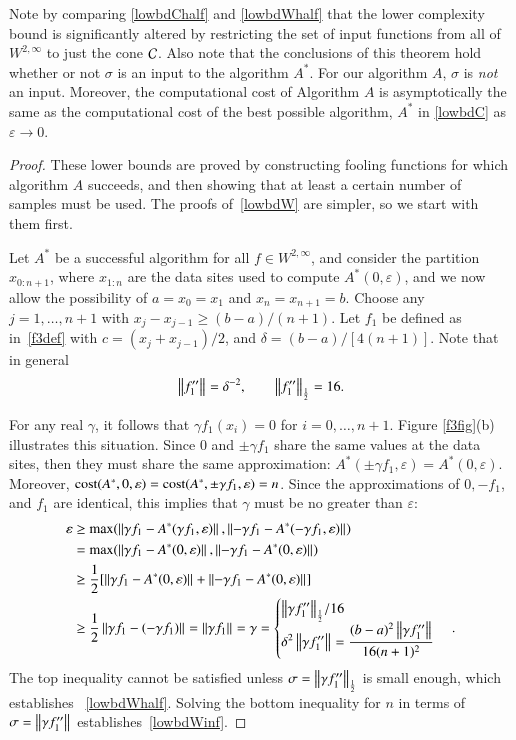\documentclass[review]{elsarticle}
\newcommand{\abstol}{\varepsilon}
\theoremstyle{definition}
\renewcommand{\cw}{W}
\begin{document}
Note by comparing \eqref{lowbdChalf} and \eqref{lowbdWhalf} that the lower complexity
bound is significantly altered by restricting the
set of input functions from all of $ \cw^{2,\infty}$ to just the cone
$\cc$. Also note that the
conclusions of this theorem hold whether or not $\sigma$ is an input to the
algorithm $A^*$. For our algorithm $A$, $\sigma$ is \emph{not} an input. Moreover, the
computational cost of Algorithm $A$ is asymptotically
the same as the computational cost of the best possible algorithm, $A^*$ in
\eqref{lowbdC} as $\abstol \to 0$.

\begin{proof}
	These lower bounds are proved by constructing fooling functions for which
	algorithm $A$ succeeds, and then showing that at least a certain number of
	samples must be used. The proofs of~\eqref{lowbdW} are simpler, so
	we start with them first.
		
	Let $A^*$ be a successful algorithm for all $f \in \cw^{2,\infty}$, and consider
	the partition $x_{0:n+1}$, where $x_{1:n}$ are the data sites
	used to compute $A^*(0,\abstol)$, and we now allow the possibility of $a = x_0=x_1$
	and $x_n = x_{n+1} = b$. Choose any $j=1, \ldots, n+1$ with
	$x_j-x_{j-1} \ge (b-a)/(n+1)$. Let $f_1$ be defined as in~\eqref{f3def} with $c
	= (x_j+x_{j-1})/2$, and $\delta = (b-a)/[4(n+1)]$. Note that in general
	\begin{equation}
	\norm{f_1''} =  \delta^{-2}, \qquad \norm[\frac 12]{f_1''} = 16.
	\end{equation}

	For any real $\gamma$, it follows that $\gamma f_1(x_i)=0$ for $i=0, \ldots,
	n+1$. Figure \ref{f3fig}(b) illustrates this situation. Since $0$ and $\pm
	\gamma f_1$ share the same values at the data sites, then they must share the
	same approximation: $A^*(\pm \gamma f_1,\abstol) = A^*(0,\abstol)$. Moreover,
	$\cost(A^*,0,\abstol) = \cost(A^*,\pm \gamma f_1,\abstol) = n$. Since the
	approximations of $0, -f_1$, and $f_1$ are identical, this implies that $\gamma$
	must be no greater than $\abstol$:
	\begin{align*}
	\abstol  &\ge \max(\norm{\gamma f_1 - A^*(\gamma f_1,\abstol)},
	\norm{-\gamma f_1 - A^*(-\gamma f_1,\abstol)}) \\
	&= \max(\norm{\gamma f_1 - A^*(0,\abstol)}, \norm{-\gamma f_1 - A^*(0,\abstol)}) \\
	& \ge \frac{1}{2} [\norm{\gamma f_1 - A^*(0,\abstol)}
	+ \norm{-\gamma f_1 - A^*(0,\abstol)}] \\
	& \ge \frac{1}{2} \norm{\gamma f_1 - (-\gamma f_1)} =  \norm{\gamma f_1}
	= \gamma %
	= \begin{cases} \displaystyle { \norm[\frac 12]{\gamma f_1''}}/{16}  \\
	\displaystyle \delta^2 	\norm{\gamma f_1''}
	=  \frac{(b-a)^2 \norm{\gamma f_1''}}{16(n+1)^2}
	\end{cases}.
	\end{align*}
	The top inequality cannot be satisfied unless $\sigma = \norm[\frac 12]{\gamma
	f_1''}$ is small enough, which establishes ~\eqref{lowbdWhalf}. Solving the
	bottom inequality for $n$ in terms of $\sigma = \norm{\gamma f_1''}$
	establishes~\eqref{lowbdWinf}.


\end{proof}
\end{document}
